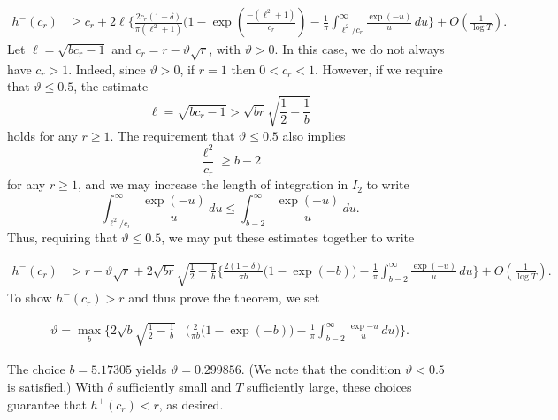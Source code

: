 \documentclass[oneside]{amsart}
\begin{document}
\begin{equation*}\begin{split}
h^-(c_r) &\ge c_r+2\ell\biggl\{ \frac{2c_r(1-\delta)}{\pi(\ell^2+1)}\biggl(1-\exp\left(\frac{-(\ell^2+1)}{c_r} \right)- \frac{1}{\pi}\int_{\ell^2/c_r}^{\infty}\frac{\exp(-u)}{u}\,du\biggr\}  +O\left(\frac{1}{\log T}\right).
\end{split}\end{equation*}
Let $\ell= \sqrt{bc_r-1}$ and $c_r = r - \vartheta\sqrt{r}$, with $\vartheta>0$. In this case, we do not always have $c_r >1$. Indeed, since $\vartheta>0$, if $r=1$ then $0< c_r <1$. However, if we require that $\vartheta \le 0.5$, the estimate 
\[
\ell = \sqrt{bc_r-1} > \sqrt{br}\sqrt{\frac{1}{2}-\frac{1}{b}}
\]
holds for any $r\ge 1$. The requirement that $\vartheta \le 0.5$ also implies
\[
\frac{\ell^2}{c_r}\ge b-2
\]
for any $r\ge 1$, and we may increase the length of integration in $I_2$ to write
\[
\int_{\ell^2/c_r}^{\infty}\frac{\exp(-u)}{u}\,du \le \int_{b-2}^{\infty}\frac{\exp(-u)}{u}\,du.
\]
Thus, requiring that $\vartheta\le0.5$, we may put these estimates together to write 

\begin{equation*}\begin{split}
h^-(c_r)&> r - \vartheta\sqrt{r}+ 2\sqrt{br}\sqrt{\frac{1}{2}-\frac{1}{b}}\bigg\{\frac{2(1-\delta)}{\pi b}\biggl(1-\exp\left(-b\right) \biggr)-\frac{1}{\pi}\int_{b-2}^{\infty}\frac{\exp(-u)}{u}\,du\biggr\}  + O\left(\frac{1}{\log T}\right).\end{split}\end{equation*}
To show $h^-(c_r)> r$ and thus prove the theorem, we set

\begin{equation*}\begin{split}
\vartheta = \max_{b}\biggl\{2\sqrt{b}\sqrt{\frac{1}{2}-\frac{1}{b}}&\biggl(\frac{2}{\pi b}(1-\exp\left(-b\right)\biggr)-\frac{1}{\pi}\int_{b-2}^{\infty}\frac{\exp{-u}}{u}\,du\biggr)\biggr\}.
\end{split}\end{equation*}

The choice $b=5.17305$ yields $\vartheta=0.299856$. (We note that the condition $\vartheta <0.5$ is satisfied.) With $\delta$ sufficiently small and $T$ sufficiently large, these choices guarantee that $h^+(c_r)<r$, as desired. 
\end{document}
